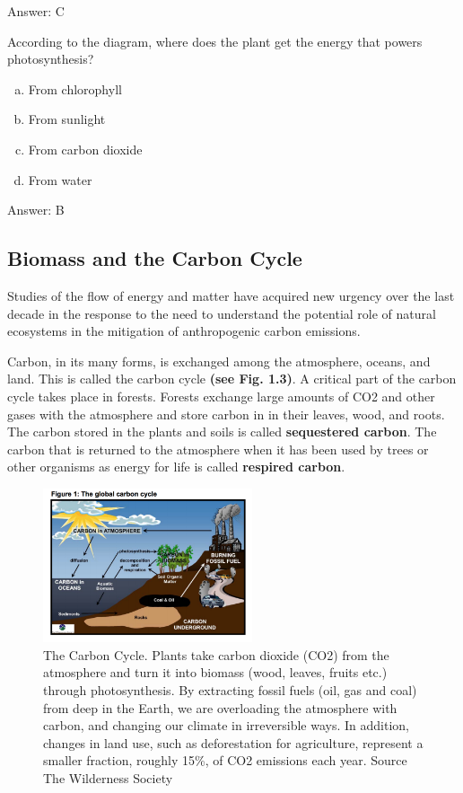 Answer: C

\begin{problem}
According to the diagram, where does the plant get the energy that powers photosynthesis?
\begin{enumerate}[(a)]
\item From chlorophyll
\item From sunlight
\item From carbon dioxide
\item From water
\end{enumerate}  

Answer: B
\end{problem}

\subsection{Biomass and the Carbon Cycle}

Studies of the flow of energy and matter have acquired new urgency over the last decade in the response to the need to understand the potential role of natural ecosystems in the mitigation of anthropogenic carbon emissions.

   Carbon, in its many forms, is exchanged among the atmosphere, oceans, and land. This is called the carbon cycle \textbf{(see Fig. 1.3)}. A critical part of the carbon cycle takes place in forests. Forests exchange large amounts of CO2 and other gases with the atmosphere and store carbon in in their leaves, wood, and roots. The carbon stored in the plants and soils is called \textbf{sequestered carbon}. The carbon that is returned to the atmosphere when it has been used by trees or other organisms as energy for life is called \textbf{respired carbon}. 
  
    \begin{figure}[ht]
    \centering
        \includegraphics[width = 0.55\textwidth]{graphics/carboncycle.png}
        \caption{The Carbon Cycle. Plants take carbon dioxide (CO2) from the atmosphere and turn it into biomass (wood, leaves, fruits etc.) through photosynthesis. By extracting fossil fuels (oil, gas and coal) from deep in the Earth, we are overloading the atmosphere with carbon, and changing our climate in irreversible ways. In addition, changes in land use, such as deforestation for agriculture, represent a smaller fraction, roughly 15\%, of CO2 emissions each year. Source The Wilderness Society}
    \end{figure}


